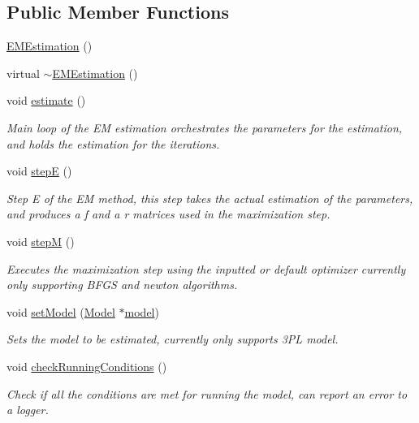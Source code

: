 \subsection*{Public Member Functions}
\begin{DoxyCompactItemize}
\item 
\hyperlink{classEMEstimation_a942acb2a0dcbd99dbd2669d6743e0e51}{E\+M\+Estimation} ()
\item 
virtual \hyperlink{classEMEstimation_a218c478d8b1b49c4ea9076ba30852c9d}{$\sim$\+E\+M\+Estimation} ()
\item 
void \hyperlink{classEMEstimation_a7391808764fd510d6a0f0351ec699b2d}{estimate} ()
\begin{DoxyCompactList}\small\item\em Main loop of the E\+M estimation orchestrates the parameters for the estimation, and holds the estimation for the iterations. \end{DoxyCompactList}\item 
void \hyperlink{classEMEstimation_afd00a80808f85581961d4d0ed2ce2a97}{step\+E} ()
\begin{DoxyCompactList}\small\item\em Step E of the E\+M method, this step takes the actual estimation of the parameters, and produces a f and a r matrices used in the maximization step. \end{DoxyCompactList}\item 
void \hyperlink{classEMEstimation_a8884e863f820e4a1a5caf099dca2ce1b}{step\+M} ()
\begin{DoxyCompactList}\small\item\em Executes the maximization step using the inputted or default optimizer currently only supporting B\+F\+G\+S and newton algorithms. \end{DoxyCompactList}\item 
void \hyperlink{classEMEstimation_a6cd3ac7193ff9d5d92bd90b58da26e11}{set\+Model} (\hyperlink{classModel}{Model} $\ast$\hyperlink{classEMEstimation_ad7a5d7459c7c0632a1aa3917fd7f3ba0}{model})
\begin{DoxyCompactList}\small\item\em Sets the model to be estimated, currently only supports 3\+P\+L model. \end{DoxyCompactList}\item 
void \hyperlink{classEMEstimation_a482fdb64918b8e5d68e2f5091bef4b05}{check\+Running\+Conditions} ()
\begin{DoxyCompactList}\small\item\em Check if all the conditions are met for running the model, can report an error to a logger. \end{DoxyCompactList}\item 

\end{DoxyCompactItemize}
